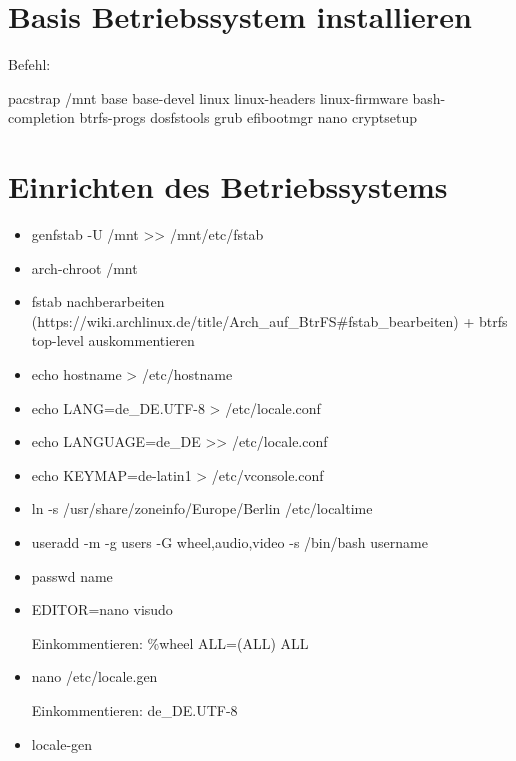 \documentclass[11pt,a4paper]{article}
\begin{document}
\section{Basis Betriebssystem installieren}
Befehl:

pacstrap /mnt base base-devel linux linux-headers  linux-firmware  \textcolor{red}{} bash-completion btrfs-progs dosfstools grub efibootmgr nano cryptsetup
\section{Einrichten des Betriebssystems}
\begin{itemize}
\item genfstab -U /mnt >{}> /mnt/etc/fstab
\item arch-chroot /mnt
\item fstab nachberarbeiten (https://wiki.archlinux.de/title/Arch\_auf\_BtrFS\#fstab\_bearbeiten) + btrfs top-level auskommentieren
\item echo \grqq{}hostname\grqq{} > /etc/hostname
\item echo LANG=de\_DE.UTF-8 > /etc/locale.conf
\item echo LANGUAGE=de\_DE >{}> /etc/locale.conf
\item echo KEYMAP=de-latin1 > /etc/vconsole.conf
\item ln -s /usr/share/zoneinfo/Europe/Berlin /etc/localtime
\item useradd -m -g users -G wheel,audio,video -s /bin/bash \glqq{}username\grqq{} 
\item passwd \glqq{}name\grqq{}
\item EDITOR=nano visudo

Einkommentieren: \%wheel ALL=(ALL) ALL
\item nano /etc/locale.gen

Einkommentieren: de\_DE.UTF-8
\item locale-gen

\end{itemize}
\end{document}
